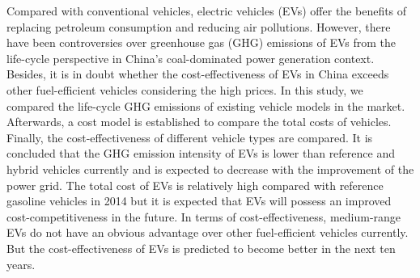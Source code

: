 Compared with conventional vehicles, electric vehicles (EVs) offer the benefits of replacing petroleum consumption and reducing air pollutions. However, there have been controversies over greenhouse gas (GHG) emissions of EVs from the life-cycle perspective in China’s coal-dominated power generation context. Besides, it is in doubt whether the cost-effectiveness of EVs in China exceeds other fuel-efficient vehicles considering the high prices. In this study, we compared the life-cycle GHG emissions of existing vehicle models in the market. Afterwards, a cost model is established to compare the total costs of vehicles. Finally, the cost-effectiveness of different vehicle types are compared. It is concluded that the GHG emission intensity of EVs is lower than reference and hybrid vehicles currently and is expected to decrease with the improvement of the power grid. The total cost of EVs is relatively high compared with reference gasoline vehicles in 2014 but it is expected that EVs will possess an improved cost-competitiveness in the future. In terms of cost-effectiveness, medium-range EVs do not have an obvious advantage over other fuel-efficient vehicles currently. But the cost-effectiveness of EVs is predicted to become better in the next ten years.
